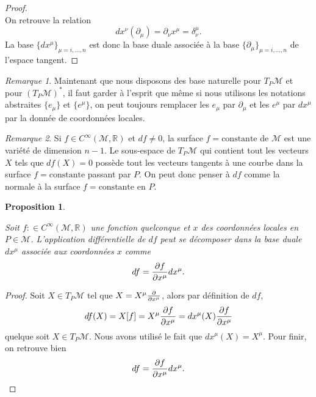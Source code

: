 \documentclass[a4paper,11pt]{report}
\theoremstyle{definition}
\theoremstyle{plain}
\newtheorem{prop}[thm]{Proposition}
\theoremstyle{definition}
\theoremstyle{remark}
\newtheorem{rmk}{Remarque}[chapter]
\newcommand{\M}{\mathscr{M}}
\newcommand{\p}{\partial}
\begin{document}
                \begin{proof}${}$\\
                    On retrouve la relation
                    \begin{equation}
                        dx^\nu(\p_\mu) = \p_\nu x^\mu = \delta^\mu_\nu.
                    \end{equation}
                    La base $\{dx^\mu\}_{\mu=i,\dots,n}$ est donc la base duale associée à la base $\{\p_\mu\}_{\mu=i,\dots,n}$ de l'espace tangent.
                \end{proof}
                
                \begin{rmk}
                    Maintenant que nous disposons des base naturelle pour $T_P\M$ et pour $(T_P\M)^*$, il faut garder à l'esprit que même si nous utilisons les notations abstraites $\{e_\mu\}$ et $\{e^\mu\}$, on peut toujours remplacer les $e_\mu$ par $\p_\mu$ et les $e^\mu$ par $dx^\mu$ par la donnée de coordonnées locales.
                \end{rmk}
                
                \begin{rmk}
                    Si $f\in C^\infty(\M,\mathbb{R})$ et $df\neq0$, la surface $f=\text{constante}$ de $\M$ est une variété de dimension $n-1$. Le sous-espace de $T_P\M$ qui contient tout les vecteurs $X$ tels que $df(X) = 0$ possède tout les vecteurs tangents à une courbe dans la surface $f=\text{constante}$ passant par $P$. On peut donc penser à $df$ comme la normale à la surface $f=\text{constante}$ en $P$.
                \end{rmk}
                
                \begin{prop}\begin{leftbar}
                    Soit $f:\in C^\infty(\M,\mathbb{R})$ une fonction quelconque et $x$ des coordonnées locales en $P\in\M$. L'application différentielle de $df$ peut se décomposer dans la base duale $dx^\mu$ associée aux coordonnées $x$ comme
                    \begin{equation}
                        df = \pdv{f}{x^\mu}dx^\mu.
                    \end{equation}
                \end{leftbar}\end{prop}
                
                \begin{proof}
                    Soit $X\in T_P\M$ tel que $X = X^\mu\pdv{}{x^\mu}$, alors par définition de $df$,
                    \begin{equation}
                        df(X) = X[f] = X^\mu\pdv{f}{x^\mu} = dx^\mu(X)\pdv{f}{x^\mu}
                    \end{equation}
                    quelque soit $X\in T_P\M$. Nous avons utilisé le fait que $dx^\mu(X) = X^\mu$. Pour finir, on retrouve bien
                    \begin{equation}
                        df = \pdv{f}{x^\mu}dx^\mu.
                    \end{equation}
                \end{proof}
\end{document}
